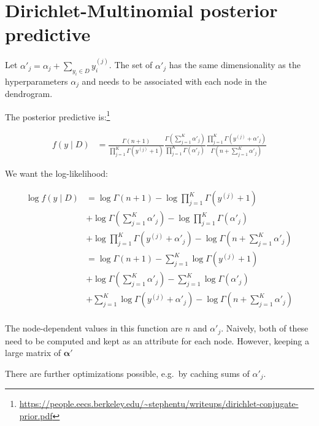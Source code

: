 \documentclass[letterpaper]{article}
\begin{document}
\section{Dirichlet-Multinomial posterior predictive}

Let $\alpha'_j = \alpha_j + \sum_{y_i \in D} y_i^{(j)}$. The set of $\alpha'_j$ has the same
dimensionality as the hyperparameters $\alpha_j$ and needs to be associated with each node in the
dendrogram.

The posterior predictive
is:\footnote{\url{https://people.eecs.berkeley.edu/~stephentu/writeups/dirichlet-conjugate-prior.pdf}}

\begin{align*}
  f(y \mid D) &= \frac{\Gamma(n + 1)}{\prod_{j = 1}^K \Gamma(y^{(j)} + 1)} \frac{\Gamma\left(\sum_{j =
  1}^K \alpha'_j\right)}{\prod_{j = 1}^K \Gamma(\alpha'_j)} \frac{\prod_{j = 1}^K \Gamma(y^{(j)} +
\alpha'_j)}{\Gamma\left(n + \sum_{j = 1}^K \alpha'_j\right)}
\end{align*}
  
We want the log-likelihood:

\begin{align*}
  \log f(y \mid D) &= \log \Gamma(n + 1) - \log \prod_{j = 1}^K \Gamma(y^{(j)} + 1)
  \\
  & + \log \Gamma\left(\sum_{j = 1}^K \alpha'_j\right) - \log \prod_{j = 1}^K
  \Gamma(\alpha'_j) \\
  &+ \log \prod_{j = 1}^K \Gamma(y^{(j)} + \alpha'_j) - \log \Gamma\left(n + \sum_{j = 1}^K \alpha'_j\right) \\
  &=
  \log \Gamma(n + 1) - \sum_{j = 1}^K \log \Gamma(y^{(j)} + 1)
  \\
  & + \log \Gamma\left(\sum_{j = 1}^K \alpha'_j\right) - \sum_{j = 1}^K
  \log \Gamma(\alpha'_j) \\
  &+ \sum_{j = 1}^K \log \Gamma(y^{(j)} + \alpha'_j) - \log \Gamma\left(n + \sum_{j = 1}^K \alpha'_j\right) \\
\end{align*}

The node-dependent values in this function are $n$ and $\alpha'_j$. Naively, both of these need to
be computed and kept as an attribute for each node. However, keeping a large matrix of
$\boldsymbol{\alpha}'$

There are further optimizations possible, e.g.\ by
caching sums of $\alpha'_j$.
\end{document}
